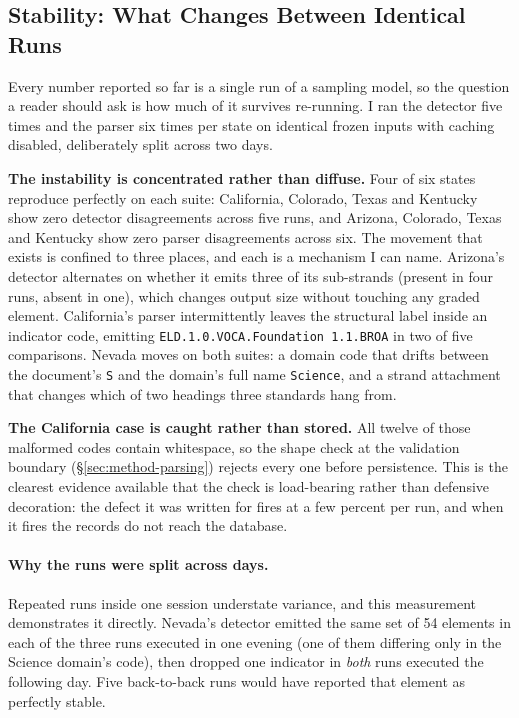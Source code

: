 \subsection{Stability: What Changes Between Identical Runs}
\label{sec:experiments-stability}

Every number reported so far is a single run of a sampling model, so the
question a reader should ask is how much of it survives re-running. I ran the
detector five times and the parser six times per state on identical frozen
inputs with caching disabled, deliberately split across two days.



\textbf{The instability is concentrated rather than diffuse.} Four of six
states reproduce perfectly on each suite: California, Colorado, Texas and
Kentucky show zero detector disagreements across five runs, and Arizona,
Colorado, Texas and Kentucky show zero parser disagreements across six. The movement
that exists is confined to three places, and each is a mechanism I can name.
Arizona's detector alternates on whether it emits three of its sub-strands
(present in four runs, absent in one), which changes output size without
touching any graded element. California's parser intermittently leaves the structural label inside
an indicator code, emitting \texttt{ELD.1.0.VOCA.Foundation 1.1.BROA} in two of
five comparisons. Nevada moves on both suites: a domain code that drifts between
the document's \texttt{S} and the domain's full name \texttt{Science}, and a strand
attachment that changes which of two headings three standards hang from.

\textbf{The California case is caught rather than stored.} All twelve of
those malformed codes contain whitespace, so the shape check at the validation
boundary (\S\ref{sec:method-parsing}) rejects every one before persistence. This
is the clearest evidence available that the check is load-bearing rather than
defensive decoration: the defect it was written for fires at a few percent per
run, and when it fires the records do not reach the database.

\paragraph{Why the runs were split across days.} Repeated runs inside one
session understate variance, and this measurement demonstrates it directly.
Nevada's detector emitted the same set of 54 elements in each of the three runs
executed in one evening (one of them differing only in the Science domain's
code), then dropped one indicator in \emph{both} runs executed the following
day. Five back-to-back runs would have reported that element as
perfectly stable.

